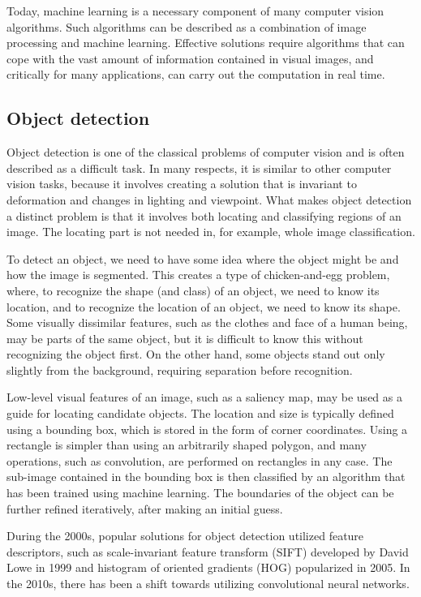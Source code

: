 Today, machine learning is a necessary component of many computer vision algorithms. Such algorithms can be described as a combination of image processing and machine learning. Effective solutions require algorithms that can cope with the vast amount of information contained in visual images, and critically for many applications, can carry out the computation in real time.

\subsection{Object detection}
Object detection is one of the classical problems of computer vision and is often described as a difficult task. In many respects, it is similar to other computer vision tasks, because it involves creating a solution that is invariant to deformation and changes in lighting and viewpoint. What makes object detection a distinct problem is that it involves both locating and classifying regions of an image. The locating part is not needed in, for example, whole image classification.

To detect an object, we need to have some idea where the object might be and how the image is segmented. This creates a type of chicken-and-egg problem, where, to recognize the shape (and class) of an object, we need to know its location, and to recognize the location of an object, we need to know its shape. Some visually dissimilar features, such as the clothes and face of a human being, may be parts of the same object, but it is difficult to know this without recognizing the object first. On the other hand, some objects stand out only slightly from the background, requiring separation before recognition.

Low-level visual features of an image, such as a saliency map, may be used as a guide for locating candidate objects. The location and size is typically defined using a bounding box, which is stored in the form of corner coordinates. Using a rectangle is simpler than using an arbitrarily shaped polygon, and many operations, such as convolution, are performed on rectangles in any case. The sub-image contained in the bounding box is then classified by an algorithm that has been trained using machine learning. The boundaries of the object can be further refined iteratively, after making an initial guess.

During the 2000s, popular solutions for object detection utilized feature descriptors, such as scale-invariant feature transform (SIFT) developed by David Lowe in 1999 and histogram of oriented gradients (HOG) popularized in 2005. In the 2010s, there has been a shift towards utilizing convolutional neural networks.

